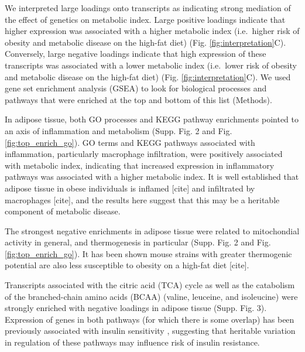 \documentclass[
]{article}
\begin{document}
We interpreted large loadings onto transcripts as indicating strong
mediation of the effect of genetics on metabolic index. Large positive
loadings indicate that higher expression was associated with a higher
metabolic index (i.e.~higher risk of obesity and metabolic disease on
the high-fat diet) (Fig. \ref{fig:interpretation}C). Conversely, large
negative loadings indicate that high expression of these transcripts was
associated with a lower metabolic index (i.e.~lower risk of obesity and
metabolic disease on the high-fat diet) (Fig.
\ref{fig:interpretation}C). We used gene set enrichment analysis (GSEA)
\cite{fgsea, 
pmid16199517} to look for biological processes and pathways that were
enriched at the top and bottom of this list (Methods).

In adipose tissue, both GO processes and KEGG pathway enrichments
pointed to an axis of inflammation and metabolism (Supp. Fig. 2 and Fig.
\ref{fig:top_enrich_go}). GO terms and KEGG pathways associated with
inflammation, particularly macrophage infiltration, were positively
associated with metabolic index, indicating that increased expression in
inflammatory pathways was associated with a higher metabolic index. It
is well established that adipose tissue in obese individuals is inflamed
{[}cite{]} and infiltrated by macrophages {[}cite{]}, and the results
here suggest that this may be a heritable component of metabolic
disease.

The strongest negative enrichments in adipose tissue were related to
mitochondial activity in general, and thermogenesis in particular (Supp.
Fig. 2 and Fig. \ref{fig:top_enrich_go}). It has been shown mouse
strains with greater thermogenic potential are also less susceptible to
obesity on a high-fat diet {[}cite{]}.

Transcripts associated with the citric acid (TCA) cycle as well as the
catabolism of the branched-chain amino acids (BCAA) (valine, leuceine,
and isoleucine) were strongly enriched with negative loadings in adipose
tissue (Supp. Fig. 3). Expression of genes in both pathways (for which
there is some overlap) has been previously associated with insulin
sensitivity \cite{pmid29567659, 
pmid22560213, pmid19841271}, suggesting that heritable variation in
regulation of these pathways may influence risk of insulin resistance.
\end{document}

